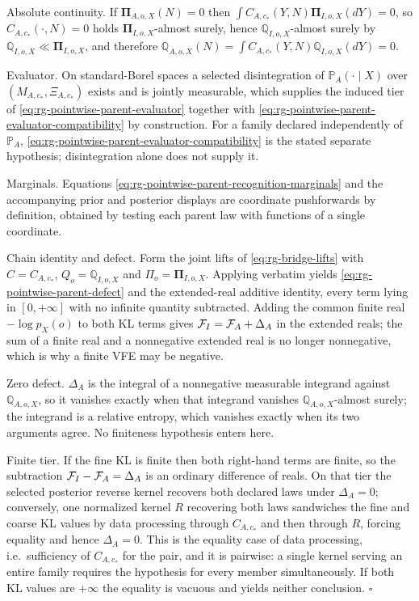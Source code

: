 Absolute continuity.  If $\boldsymbol\Pi_{A,o,X}(N)=0$ then
$\int C_{A,c_*}(Y,N)\boldsymbol\Pi_{I,o,X}(dY)=0$, so
$C_{A,c_*}(\cdot,N)=0$ holds
$\boldsymbol\Pi_{I,o,X}$-almost surely, hence $\mathbb Q_{I,o,X}$-almost surely by
$\mathbb Q_{I,o,X}\ll\boldsymbol\Pi_{I,o,X}$, and therefore
$\mathbb Q_{A,o,X}(N)=\int C_{A,c_*}(Y,N)\mathbb Q_{I,o,X}(dY)=0$.

Evaluator.  On standard-Borel spaces a selected disintegration of $\mathbb P_A(\cdot\mid X)$ over
$(M_{A,c_*},\Xi_{A,c_*})$ exists and is jointly measurable, which supplies the induced tier of
\eqref{eq:rg-pointwise-parent-evaluator} together with
\eqref{eq:rg-pointwise-parent-evaluator-compatibility} by construction.  For a family declared
independently of $\mathbb P_A$, \eqref{eq:rg-pointwise-parent-evaluator-compatibility} is the stated
separate hypothesis; disintegration alone does not supply it.

Marginals.  Equations \eqref{eq:rg-pointwise-parent-recognition-marginals} and the accompanying
prior and posterior displays are coordinate pushforwards by definition, obtained by testing each
parent law with functions of a single coordinate.

Chain identity and defect.  Form the joint lifts of
\eqref{eq:rg-bridge-lifts} with $C=C_{A,c_*}$, $Q_o=\mathbb Q_{I,o,X}$ and
$\Pi_o=\boldsymbol\Pi_{I,o,X}$.  Applying  verbatim yields
\eqref{eq:rg-pointwise-parent-defect} and the extended-real additive identity, every term lying in
$[0,+\infty]$ with no infinite quantity subtracted.  Adding the common finite real $-\log p_X(o)$ to
both KL terms gives $\mathcal F_I=\mathcal F_A+\Delta_A$ in the extended reals; the sum of a finite real
and a nonnegative extended real is no longer nonnegative, which is why a finite VFE may be negative.

Zero defect.  $\Delta_A$ is the integral of a nonnegative measurable integrand against
$\mathbb Q_{A,o,X}$, so it vanishes exactly when that integrand vanishes
$\mathbb Q_{A,o,X}$-almost surely; the integrand is a relative entropy, which vanishes exactly when
its two arguments agree.  No finiteness hypothesis enters here.

Finite tier.  If the fine KL is finite then both right-hand terms are finite, so the subtraction
$\mathcal F_I-\mathcal F_A=\Delta_A$ is an ordinary difference of reals.  On that tier the selected
posterior reverse kernel recovers both declared laws under $\Delta_A=0$; conversely, one normalized
kernel $R$ recovering both laws sandwiches the fine and coarse KL values by data processing through
$C_{A,c_*}$ and then through $R$, forcing equality and hence $\Delta_A=0$.  This is the equality case of
data processing, i.e.\ sufficiency of $C_{A,c_*}$ for the pair, and it is pairwise: a single kernel serving
an entire family requires the hypothesis for every member simultaneously.  If both KL values are
$+\infty$ the equality is vacuous and yields neither conclusion.  $\square$

